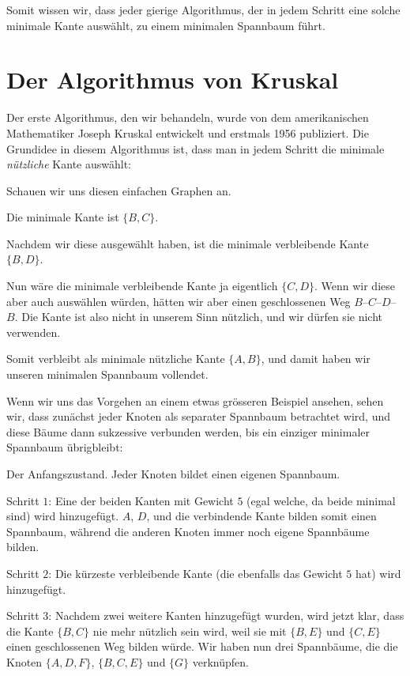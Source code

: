 \documentclass[12pt,a4paper]{report}
\theoremstyle{break}
\theoremstyle{plain}
\newcommand{\algostep}[2]{\noindent\parbox{4cm}{\scalebox{0.5}{\texttt{[image: \#1]}}}
  \hfill
  \parbox{7cm}{#2}
  \vskip -5mm
}
\begin{document}
Somit wissen wir, dass jeder gierige Algorithmus, der in jedem Schritt eine
solche minimale Kante ausw\"{a}hlt, zu einem minimalen Spannbaum f\"{u}hrt.

\newpage
\section{Der Algorithmus von Kruskal}

Der erste Algorithmus, den wir behandeln, wurde von dem
amerikanischen Mathematiker Joseph Kruskal entwickelt und erstmals
1956 publiziert. Die Grundidee in diesem Algorithmus ist, dass man in
jedem Schritt die minimale \emph{n\"{u}tzliche} Kante
ausw\"{a}hlt:

\algostep{DemoSmall.pdf}{Schauen wir uns diesen einfachen Graphen
an.}
\algostep{DemoSmallKruskal1.pdf}{Die minimale Kante ist $\{B, C\}$.}
\algostep{DemoSmallKruskal2.pdf}{Nachdem wir diese ausgew\"{a}hlt
  haben, ist die minimale verbleibende Kante $\{B,D\}$.}
\algostep{DemoSmallKruskal3.pdf}{Nun w\"{a}re die minimale
  verbleibende Kante ja eigentlich $\{C,D\}$. Wenn wir diese aber auch
ausw\"{a}hlen w\"{u}rden, h\"{a}tten wir aber einen geschlossenen Weg
$B$--$C$--$D$--$B$. Die Kante ist also nicht in unserem Sinn
n\"{u}tzlich, und wir d\"{u}rfen sie nicht verwenden.}
\algostep{DemoSmallKruskal4.pdf}{Somit verbleibt als minimale
  n\"{u}tzliche Kante $\{A,B\}$, und damit haben wir unseren minimalen
  Spannbaum vollendet.}

\newpage
Wenn wir uns das Vorgehen an einem etwas gr\"{o}sseren Beispiel
ansehen, sehen wir, dass zun\"{a}chst jeder Knoten
als separater Spannbaum betrachtet wird, und diese B\"{a}ume dann
sukzessive verbunden werden, bis ein einziger minimaler Spannbaum
\"ubrigbleibt:

\algostep{Demo.pdf}{Der Anfangszustand. Jeder Knoten bildet einen
  eigenen Spannbaum.}
\algostep{DemoKruskal1.pdf}{Schritt $1$: Eine der beiden Kanten mit Gewicht $5$
  (egal welche, da beide minimal sind) wird hinzugef\"{u}gt. $A$, $D$, und die verbindende
  Kante bilden somit einen Spannbaum, w\"{a}hrend die anderen Knoten
  immer noch eigene Spannb\"{a}ume bilden.}
\algostep{DemoKruskal2.pdf}{Schritt $2$: Die k\"{u}rzeste verbleibende
  Kante (die ebenfalls das Gewicht $5$ hat) wird hinzugef\"ugt.}
\algostep{DemoKruskal3.pdf}{Schritt $3$: Nachdem zwei weitere Kanten
  hinzugef\"ugt wurden, wird jetzt klar, dass die Kante $\{B,C\}$ nie
  mehr n\"{u}tzlich sein wird, weil sie mit $\{B,E\}$ und $\{C,E\}$
  einen geschlossenen Weg bilden w\"{u}rde. Wir haben nun drei
  Spannb\"{a}ume, die die Knoten $\{A, D, F\}$, $\{B, C, E\}$ und
  $\{G\}$ verkn\"{u}pfen.}
\end{document}
